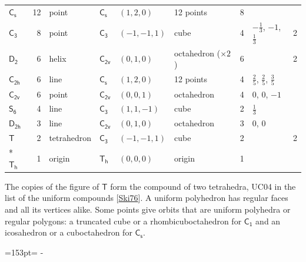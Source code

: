 \documentclass[10pt,a4paper]{article}
\newcommand{\needspace}[1]{\par\penalty-100\begingroup\dimen0=#1\relax\dimen2=\pagegoal
  \advance\dimen2-\pagetotal\ifdim\dimen0>\dimen2\relax\ifdim\dimen2>0pt\vfil\break\fi\fi
  \endgroup}
\numberwithin{equation}{section}
\newcommand{\grp}[1]{\mathsf{#1}}
\newlength{\fillwidth}\newlength{\cellwidth}\newlength{\colwidth}
\begin{document}
{{\begin{longtable}{@{}lrllllr>{\RaggedRight\arraybackslash}p{\fillwidth}r@{}}
\href{C1v.pdf}{$\grp{C_{s}}$} & 12 & point & \href{C1v.pdf}{$\grp{C_{s}}$} & $(1, 2, 0)$ & 12 points & 8 &  & \\
\href{C3.pdf}{$\grp{C_{3}}$} & 8 & point & \href{C3.pdf}{$\grp{C_{3}}$} & $(-1, -1, 1)$ & cube & 4 & ${-\tfrac{1}{3}}$, ${-1}$, ${\tfrac{1}{3}}$ & 2\\
\href{D2.pdf}{$\grp{D_{2}}$} & 6 & helix & \href{C2v.pdf}{$\grp{C_{2v}}$} & $(0, 1, 0)$ & octahedron (${\times}2$) & 6 &  & 2\\
\href{C2h.pdf}{$\grp{C_{2h}}$} & 6 & line & \href{C1v.pdf}{$\grp{C_{s}}$} & $(1, 2, 0)$ & 12 points & 4 & ${\tfrac{2}{5}}$, ${\tfrac{2}{5}}$, ${\tfrac{3}{5}}$ & \\
\href{C2v.pdf}{$\grp{C_{2v}}$} & 6 & point & \href{C2v.pdf}{$\grp{C_{2v}}$} & $(0, 0, 1)$ & octahedron & 4 & ${0}$, ${0}$, ${-1}$ & \\
\href{S6.pdf}{$\grp{S_{6}}$} & 4 & line & \href{C3.pdf}{$\grp{C_{3}}$} & $(1, 1, -1)$ & cube & 2 & ${\tfrac{1}{3}}$ & \\
\href{D2h.pdf}{$\grp{D_{2h}}$} & 3 & line & \href{C2v.pdf}{$\grp{C_{2v}}$} & $(0, 1, 0)$ & octahedron & 3 & ${0}$, ${0}$ & \\
\href{T.pdf}{$\grp{T}$} & 2 & tetrahedron & \href{C3.pdf}{$\grp{C_{3}}$} & $(-1, -1, 1)$ & cube & 2 &  & 2\\*
\href{Th.pdf}{$\grp{T_{h}}$} & 1 & origin & \href{Th.pdf}{$\grp{T_{h}}$} & $(0, 0, 0)$ & origin & 1 &  & \\
\bottomrule\end{longtable}}}
The copies of the figure of \href{T.pdf}{$\grp{T}$} form the compound of two tetrahedra, UC04 in the list of the uniform compounds [\href{../../../REFERENCES.pdf\#ref.Ski76}{Ski76}]. A uniform polyhedron has regular faces and all its vertices alike. Some points give orbits that are uniform polyhedra or regular polygons: a truncated cube or a rhombicuboctahedron for \href{C1.pdf}{$\grp{C_{1}}$} and an icosahedron or a cuboctahedron for \href{C1v.pdf}{$\grp{C_{s}}$}.
\needspace{153pt}
\end{document}

